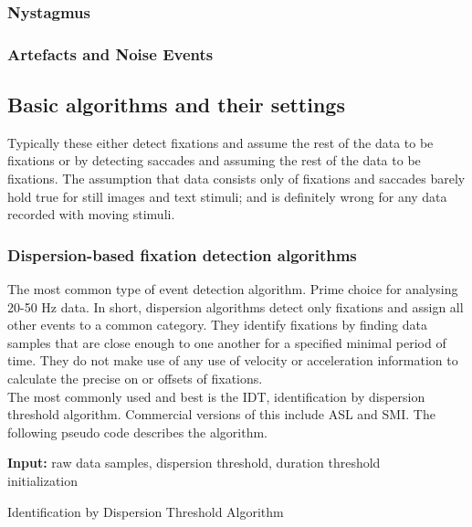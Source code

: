 \documentclass[12pt]{article}
\theoremstyle{definition}
\begin{document}
\subsubsection{Nystagmus}

\subsubsection{Artefacts and Noise Events}



\subsection{Basic algorithms and their settings}
Typically these either detect fixations and assume the rest of the data to be fixations or by detecting saccades and assuming the rest of the data to be fixations. The assumption that data consists only of fixations and saccades barely hold true for still images and text stimuli; and is definitely wrong for any data recorded with moving stimuli.

\subsubsection{Dispersion-based fixation detection algorithms}
The most common type of event detection algorithm. Prime choice for analysing 20-50 Hz data. In short, dispersion algorithms detect only fixations and assign all other events to a common category. They identify fixations by finding data samples that are close enough to one another for a specified minimal period of time. They do not make use of any use of velocity or acceleration information to calculate the precise on or offsets of fixations.\\

The most commonly used and best is the IDT, identification by dispersion threshold algorithm. Commercial versions of this include ASL and SMI. The following pseudo code describes the algorithm.  

\begin{algorithm}[H]
\SetAlgoLined
\textbf{Input:} raw data samples, dispersion threshold, duration threshold\\
 initialization\;
 
 \caption{Identification by Dispersion Threshold Algorithm}
\end{algorithm}
\end{document}
